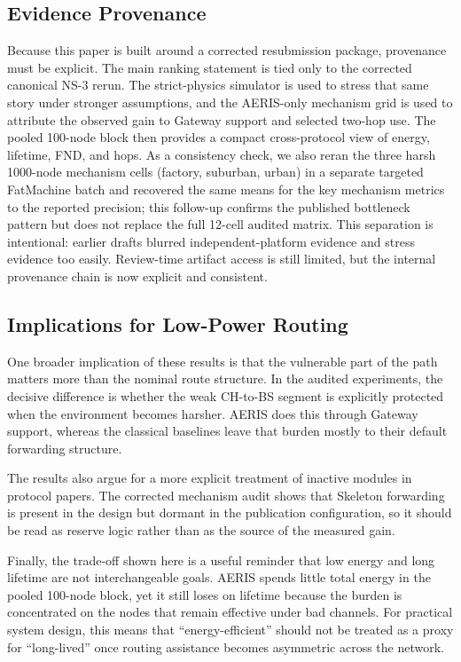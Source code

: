 \documentclass[letterpaper,conference]{IEEEtran}
\begin{document}
\balance
\subsection{Evidence Provenance}
Because this paper is built around a corrected resubmission package, provenance must be explicit. The main ranking statement is tied only to the corrected canonical NS-3 rerun. The strict-physics simulator is used to stress that same story under stronger assumptions, and the AERIS-only mechanism grid is used to attribute the observed gain to Gateway support and selected two-hop use. The pooled 100-node block then provides a compact cross-protocol view of energy, lifetime, FND, and hops. As a consistency check, we also reran the three harsh 1000-node mechanism cells (factory, suburban, urban) in a separate targeted FatMachine batch and recovered the same means for the key mechanism metrics to the reported precision; this follow-up confirms the published bottleneck pattern but does not replace the full 12-cell audited matrix. This separation is intentional: earlier drafts blurred independent-platform evidence and stress evidence too easily. Review-time artifact access is still limited, but the internal provenance chain is now explicit and consistent.

\subsection{Implications for Low-Power Routing}
One broader implication of these results is that the vulnerable part of the path matters more than the nominal route structure. In the audited experiments, the decisive difference is whether the weak CH-to-BS segment is explicitly protected when the environment becomes harsher. AERIS does this through Gateway support, whereas the classical baselines leave that burden mostly to their default forwarding structure.

The results also argue for a more explicit treatment of inactive modules in protocol papers. The corrected mechanism audit shows that Skeleton forwarding is present in the design but dormant in the publication configuration, so it should be read as reserve logic rather than as the source of the measured gain.

Finally, the trade-off shown here is a useful reminder that low energy and long lifetime are not interchangeable goals. AERIS spends little total energy in the pooled 100-node block, yet it still loses on lifetime because the burden is concentrated on the nodes that remain effective under bad channels. For practical system design, this means that ``energy-efficient'' should not be treated as a proxy for ``long-lived'' once routing assistance becomes asymmetric across the network.
\end{document}
